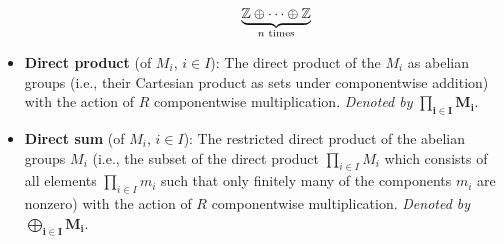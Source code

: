 \documentclass[../notes.tex]{subfiles}
\begin{document}
\begin{itemize}
\begin{itemize}
\begin{equation*}
            \underbrace{\mathbb{Z}\oplus\cdots\oplus\mathbb{Z}}_{n\text{ times}}
        \end{equation*}
    \end{itemize}
    \item {}\textbf{Direct product} (of $M_i$, $i\in I$): The direct product of the $M_i$ as abelian groups (i.e., their Cartesian product as sets under componentwise addition) with the action of $R$ componentwise multiplication. \emph{Denoted by} $\bm{\prod_{i\in I}M_i}$.
    \item \textbf{Direct sum} (of $M_i$, $i\in I$): The restricted direct product of the abelian groups $M_i$ (i.e., the subset of the direct product $\prod_{i\in I}M_i$ which consists of all elements $\prod_{i\in I}m_i$ such that only finitely many of the components $m_i$ are nonzero) with the action of $R$ componentwise multiplication. \emph{Denoted by} $\bm{\bigoplus_{i\in I}M_i}$.
\end{itemize}
\setcounter{proposition}{0}
\end{document}
